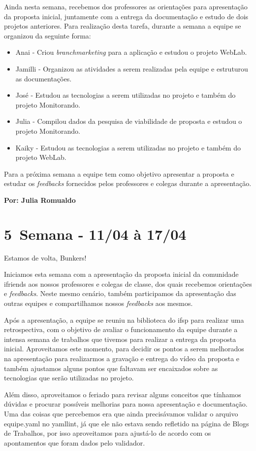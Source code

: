 Ainda nesta semana, recebemos dos professores as orientações para apresentação da proposta inicial, juntamente com a entrega da documentação e estudo de dois projetos anteriores. Para realização desta tarefa, durante a semana a equipe se organizou da seguinte forma:
\begin{itemize}
    \item Anai -  Criou \textsl{branchmarketing} para a aplicação e estudou o projeto WebLab.
    \item Jamilli - Organizou as atividades a serem realizadas pela equipe e estruturou as documentações.
    \item José - Estudou as tecnologias a serem utilizadas no projeto e também do projeto Monitorando.
    \item Julia - Compilou dados da pesquisa de viabilidade de proposta e estudou o  projeto Monitorando.
    \item Kaiky -  Estudou as tecnologias a serem utilizadas no projeto e também do projeto WebLab.
\end{itemize}
Para a próxima semana a equipe tem como objetivo apresentar a proposta e estudar os \textsl{feedbacks} fornecidos pelos professores e colegas durante a apresentação.

\textbf{Por: Julia Romualdo} 

\section{5\textordfeminine \, Semana - 11/04 à 17/04}
 Estamos de volta, Bunkers!

Iniciamos esta semana com a apresentação da proposta inicial da comunidade \gls{ifriends} aos nossos professores e colegas de classe, dos quais recebemos orientações e \textsl{feedbacks}. Neste mesmo cenário, também participamos da apresentação das outras equipes e compartilhamos nossos \textsl{feedbacks} aos mesmos.

Após a apresentação, a equipe se reuniu na biblioteca do \acs{ifsp} para realizar uma retrospectiva, com o objetivo de avaliar o funcionamento da equipe durante a intensa semana de trabalhos que tivemos para realizar a entrega da proposta inicial. Aproveitamos este momento, para decidir os pontos a serem melhorados na apresentação para realizarmos a gravação e entrega do vídeo da proposta e também ajustamos alguns pontos que faltavam ser encaixados sobre as tecnologias que serão utilizadas no projeto.

Além disso, aproveitamos o feriado para revisar alguns conceitos que tínhamos dúvidas e procurar possíveis melhorias para nossa apresentação e documentação. Uma das coisas que percebemos era que ainda precisávamos validar o arquivo equipe.yaml no yamllint, já que ele não estava sendo refletido na página de Blogs de Trabalhos, por isso aproveitamos para ajustá-lo de acordo com os apontamentos que foram dados pelo validador.

